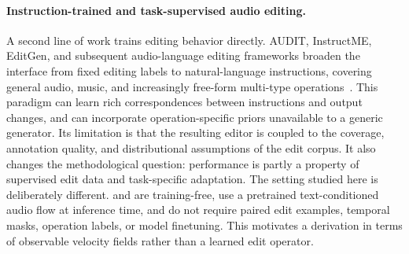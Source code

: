 \paragraph{Instruction-trained and task-supervised audio editing.}
A second line of work trains editing behavior directly.
AUDIT, InstructME, EditGen, and subsequent audio-language editing frameworks broaden the interface from fixed editing labels to natural-language instructions, covering general audio, music, and increasingly free-form multi-type operations~\cite{wang2023auditaudioeditingfollowing,han2023instructmeinstructionguidedmusic,sioros2025editgenharnessingcrossattentioncontrol,ungersbock2025saoinstructfreeformaudioediting,lan2025guidingaudioeditingaudio,tao2026mmeditunifiedframeworkmultitype}.
This paradigm can learn rich correspondences between instructions and output changes, and can incorporate operation-specific priors unavailable to a generic generator.
Its limitation is that the resulting editor is coupled to the coverage, annotation quality, and distributional assumptions of the edit corpus.
It also changes the methodological question: performance is partly a property of supervised edit data and task-specific adaptation.
The setting studied here is deliberately different.
\method and \methodplus are training-free, use a pretrained text-conditioned audio flow at inference time, and do not require paired edit examples, temporal masks, operation labels, or model finetuning.
This motivates a derivation in terms of observable velocity fields rather than a learned edit operator.

